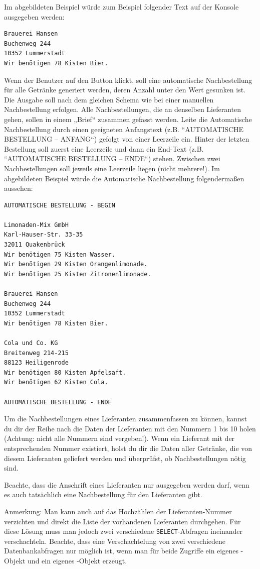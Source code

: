 \begin{compactenum}[a)]
Im abgebildeten Beispiel würde zum Beispiel folgender Text auf der Konsole
ausgegeben werden:

\begin{verbatim}
Brauerei Hansen
Buchenweg 244
10352 Lummerstadt
Wir benötigen 78 Kisten Bier.
\end{verbatim}

Wenn der Benutzer auf den Button 
klickt, soll eine automatische Nachbestellung für alle Getränke generiert
werden, deren Anzahl unter den Wert  gesunken ist. Die
Ausgabe soll nach dem gleichen Schema wie bei einer manuellen Nachbestellung
erfolgen. Alle Nachbestellungen, die an denselben Lieferanten gehen, sollen in
einem „Brief“ zusammen gefasst werden. Leite die Automatische Nachbestellung
durch einen geeigneten Anfangstext (z.B. “AUTOMATISCHE BESTELLUNG – ANFANG“)
gefolgt von einer Leerzeile ein. Hinter der letzten Bestellung soll zuerst eine
Leerzeile und dann ein End-Text (z.B. “AUTOMATISCHE BESTELLUNG – ENDE“) stehen.
Zwischen zwei Nachbestellungen soll jeweils eine Leerzeile liegen (nicht
mehrere!). Im abgebildeten Beispiel würde die Automatische Nachbestellung
folgendermaßen aussehen:

\pagebreak

\begin{verbatim}
AUTOMATISCHE BESTELLUNG - BEGIN

Limonaden-Mix GmbH
Karl-Hauser-Str. 33-35
32011 Quakenbrück
Wir benötigen 75 Kisten Wasser.
Wir benötigen 29 Kisten Orangenlimonade.
Wir benötigen 25 Kisten Zitronenlimonade.

Brauerei Hansen
Buchenweg 244
10352 Lummerstadt
Wir benötigen 78 Kisten Bier.

Cola und Co. KG
Breitenweg 214-215
88123 Heiligenrode
Wir benötigen 80 Kisten Apfelsaft.
Wir benötigen 62 Kisten Cola.

AUTOMATISCHE BESTELLUNG - ENDE
\end{verbatim}

Um die Nachbestellungen eines Lieferanten zusammenfassen zu können, kannst du
dir der Reihe nach die Daten der Lieferanten mit den Nummern 1 bis 10 holen
(Achtung: nicht alle Nummern sind vergeben!). Wenn ein Lieferant mit der
entsprechenden Nummer existiert, holst du dir die Daten aller Getränke, die von
diesem Lieferanten geliefert werden und überprüfst, ob Nachbestellungen nötig
sind.

Beachte, dass die Anschrift eines Lieferanten nur ausgegeben werden darf, wenn
es auch tatsächlich eine Nachbestellung für den Lieferanten gibt.

Anmerkung: Man kann auch auf das Hochzählen der Lieferanten-Nummer verzichten
und direkt die Liste der vorhandenen Lieferanten durchgehen. Für diese Lösung
muss man jedoch zwei verschiedene \lstinline|SELECT|-Abfragen ineinander
verschachteln. Beachte, dass eine Verschachtelung von zwei verschiedene
Da\-ten\-bank\-ab\-fra\-gen nur möglich ist, wenn man für beide Zugriffe ein
eigenes -Objekt und ein eigenes -Objekt erzeugt.
\end{compactenum}
